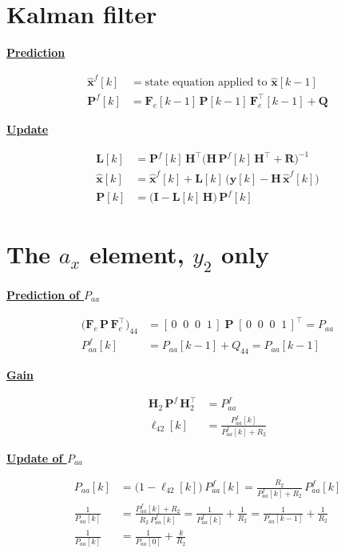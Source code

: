 \documentclass[11pt,a4paper]{ctexart}
\newcommand{\hd}[1]{\par\medskip\noindent\underline{\textbf{#1}}\par\nobreak\vspace{0.2ex}}
\begin{document}
\section{Kalman filter}

\hd{Prediction}
\[
\begin{aligned}
\hat{\mathbf{x}}^f[k] &= \text{state equation applied to } \hat{\mathbf{x}}[k-1] \\
\mathbf{P}^f[k] &= \mathbf{F}_e[k-1]\,\mathbf{P}[k-1]\,\mathbf{F}_e^{\top}[k-1] + \mathbf{Q}
\end{aligned}
\]

\hd{Update}
\[
\begin{aligned}
\mathbf{L}[k] &= \mathbf{P}^f[k]\,\mathbf{H}^{\top}\big(\mathbf{H}\,\mathbf{P}^f[k]\,\mathbf{H}^{\top} + \mathbf{R}\big)^{-1} \\
\hat{\mathbf{x}}[k] &= \hat{\mathbf{x}}^f[k] + \mathbf{L}[k]\,\big(\mathbf{y}[k] - \mathbf{H}\,\hat{\mathbf{x}}^f[k]\big) \\
\mathbf{P}[k] &= \big(\mathbf{I} - \mathbf{L}[k]\,\mathbf{H}\big)\,\mathbf{P}^f[k]
\end{aligned}
\]

\section{The $a_x$ element, $y_2$ only}

\hd{Prediction of $P_{aa}$}
\[
\begin{aligned}
\big(\mathbf{F}_e\,\mathbf{P}\,\mathbf{F}_e^{\top}\big)_{44} &= [\,0\;\;0\;\;0\;\;1\,]\;\mathbf{P}\;[\,0\;\;0\;\;0\;\;1\,]^{\top} = P_{aa} \\
P^f_{aa}[k] &= P_{aa}[k-1] + Q_{44} = P_{aa}[k-1]
\end{aligned}
\]

\hd{Gain}
\[
\begin{aligned}
\mathbf{H}_2\,\mathbf{P}^f\,\mathbf{H}_2^{\top} &= P^f_{aa} \\
\ell_{42}[k] &= \frac{P^f_{aa}[k]}{P^f_{aa}[k] + R_2}
\end{aligned}
\]

\hd{Update of $P_{aa}$}
\[
\begin{aligned}
P_{aa}[k] &= \big(1 - \ell_{42}[k]\big)\,P^f_{aa}[k] = \frac{R_2}{P^f_{aa}[k] + R_2}\,P^f_{aa}[k] \\
\frac{1}{P_{aa}[k]} &= \frac{P^f_{aa}[k] + R_2}{R_2\,P^f_{aa}[k]} = \frac{1}{P^f_{aa}[k]} + \frac{1}{R_2} = \frac{1}{P_{aa}[k-1]} + \frac{1}{R_2} \\
\frac{1}{P_{aa}[k]} &= \frac{1}{P_{aa}[0]} + \frac{k}{R_2}
\end{aligned}
\]
\end{document}
